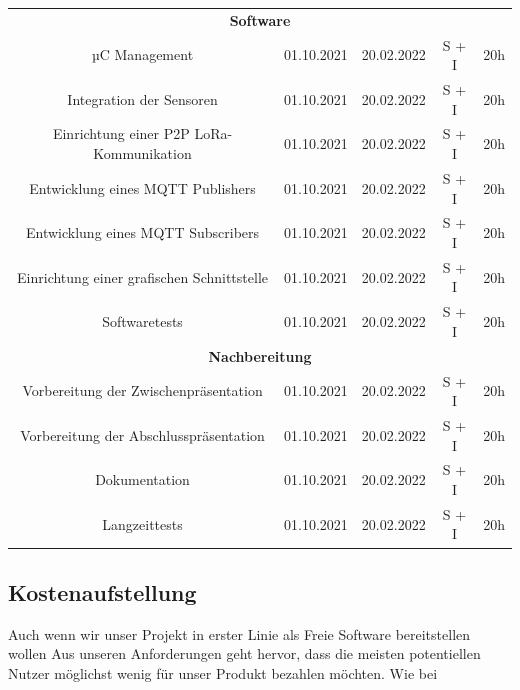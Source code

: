 \begin{adjustwidth}{-1in}{-1in}
\begin{center}
\begin{tabular}{ ccccc }
			\midrule
			\multicolumn{5}{c}{\textbf{Software}} \\
			{µC Management} & {01.10.2021} & {20.02.2022} & S + I & 20h\\
			{Integration der Sensoren} & {01.10.2021} & {20.02.2022} & S + I & 20h\\
			{Einrichtung einer P2P LoRa-Kommunikation} & {01.10.2021} & {20.02.2022} & S + I & 20h\\
			{Entwicklung eines MQTT Publishers} & {01.10.2021} & {20.02.2022} & S + I & 20h\\
			{Entwicklung eines MQTT Subscribers} & {01.10.2021} & {20.02.2022} & S + I & 20h\\
			{Einrichtung einer grafischen Schnittstelle} & {01.10.2021} & {20.02.2022} & S + I & 20h\\
			{Softwaretests} & {01.10.2021} & {20.02.2022} & S + I & 20h\\

			\midrule
			\multicolumn{5}{c}{\textbf{Nachbereitung}} \\
			{Vorbereitung der Zwischenpräsentation} & {01.10.2021} & {20.02.2022} & S + I & 20h\\
			{Vorbereitung der Abschlusspräsentation} & {01.10.2021} & {20.02.2022} & S + I & 20h\\
			{Dokumentation} & {01.10.2021} & {20.02.2022} & S + I & 20h\\
			{Langzeittests} & {01.10.2021} & {20.02.2022} & S + I & 20h\\

			\bottomrule
		\end{tabular}
		 \label{tab:worklog} 
	\end{center}

\end{adjustwidth}

\newpage

\subsection{Kostenaufstellung} \label{Kostenaufstellung}

Auch wenn wir unser Projekt in erster Linie als Freie Software bereitstellen wollen
Aus unseren Anforderungen geht hervor, dass die meisten potentiellen Nutzer möglichst wenig für unser Produkt bezahlen möchten. Wie bei 

